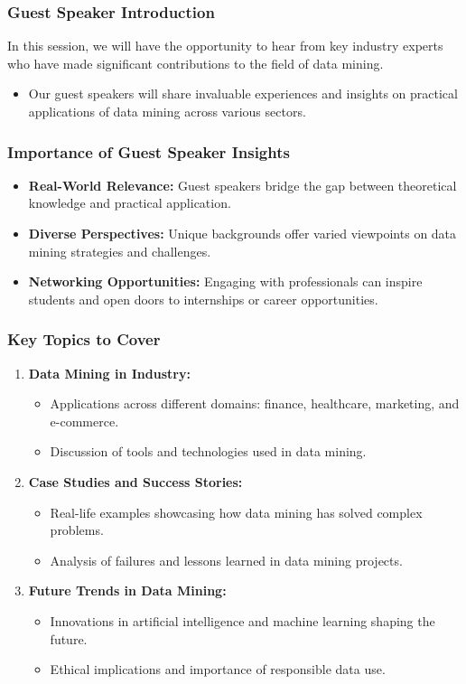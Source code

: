 \documentclass{beamer}
\begin{document}
\begin{frame}[fragile]
    \frametitle{Guest Speaker Introduction}
    In this session, we will have the opportunity to hear from key industry experts who have made significant contributions to the field of data mining.
    \begin{itemize}
        \item Our guest speakers will share invaluable experiences and insights on practical applications of data mining across various sectors.
    \end{itemize}
\end{frame}

\begin{frame}[fragile]
    \frametitle{Importance of Guest Speaker Insights}
    \begin{itemize}
        \item \textbf{Real-World Relevance:} Guest speakers bridge the gap between theoretical knowledge and practical application.
        \item \textbf{Diverse Perspectives:} Unique backgrounds offer varied viewpoints on data mining strategies and challenges.
        \item \textbf{Networking Opportunities:} Engaging with professionals can inspire students and open doors to internships or career opportunities.
    \end{itemize}
\end{frame}

\begin{frame}[fragile]
    \frametitle{Key Topics to Cover}
    \begin{enumerate}
        \item \textbf{Data Mining in Industry:}
            \begin{itemize}
                \item Applications across different domains: finance, healthcare, marketing, and e-commerce.
                \item Discussion of tools and technologies used in data mining.
            \end{itemize}
        \item \textbf{Case Studies and Success Stories:}
            \begin{itemize}
                \item Real-life examples showcasing how data mining has solved complex problems.
                \item Analysis of failures and lessons learned in data mining projects.
            \end{itemize}
        \item \textbf{Future Trends in Data Mining:}
            \begin{itemize}
                \item Innovations in artificial intelligence and machine learning shaping the future.
                \item Ethical implications and importance of responsible data use.
            \end{itemize}
    \end{enumerate}
\end{frame}
\end{document}
